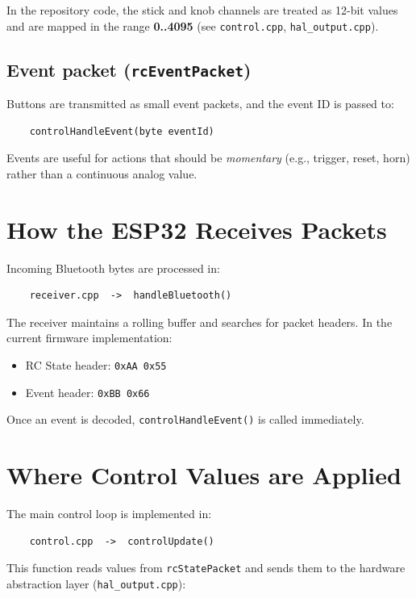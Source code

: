 In the repository code, the stick and knob channels are treated as 12-bit values and are mapped in the
range \textbf{0..4095} (see \texttt{control.cpp}, \texttt{hal\_output.cpp}).

\subsection{Event packet (\texttt{rcEventPacket})}
Buttons are transmitted as small event packets, and the event ID is passed to:

\begin{verbatim}
    controlHandleEvent(byte eventId)
\end{verbatim}

Events are useful for actions that should be \emph{momentary} (e.g., trigger, reset, horn) rather than a
continuous analog value.

\section{How the ESP32 Receives Packets}
\label{sec:receiver}

Incoming Bluetooth bytes are processed in:

\begin{verbatim}
    receiver.cpp  ->  handleBluetooth()
\end{verbatim}

The receiver maintains a rolling buffer and searches for packet headers.
In the current firmware implementation:

\begin{itemize}
    \item RC State header: \texttt{0xAA 0x55}
    \item Event header: \texttt{0xBB 0x66}
\end{itemize}

Once an event is decoded, \texttt{controlHandleEvent()} is called immediately.

\section{Where Control Values are Applied}
\label{sec:control-layer}

The main control loop is implemented in:

\begin{verbatim}
    control.cpp  ->  controlUpdate()
\end{verbatim}

This function reads values from \texttt{rcStatePacket} and sends them to the hardware abstraction layer
(\texttt{hal\_output.cpp}):

